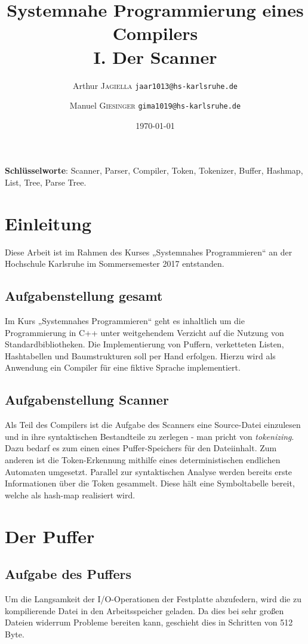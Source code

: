 \documentclass[
a4paper,   %
11pt,      %
oneside,   %
onecolumn, %
final      %
]{article}
\title{Systemnahe Programmierung eines Compilers\\I. Der Scanner}
\author{Arthur \textsc{Jagiella} \hspace{1cm} \texttt{jaar1013@hs-karlsruhe.de} \and Manuel \textsc{Giesinger} \hspace{1cm} \texttt{gima1019@hs-karlsruhe.de}}
\date{\today}
\begin{document}
\maketitle



\textbf{Schlüsselworte}: Scanner, Parser, Compiler, Token, Tokenizer, Buffer, Hashmap, List, Tree, Parse Tree.


\section{Einleitung} %
Diese Arbeit ist im Rahmen des Kurses „Systemnahes Programmieren“ an der Hochschule Karlsruhe im Sommersemester 2017 entstanden. 

\subsection{Aufgabenstellung gesamt}
Im Kurs „Systemnahes Programmieren“ geht es inhaltlich um die Programmierung in C++ unter weitgehendem Verzicht auf die Nutzung von Standardbibliotheken. Die Implementierung von Puffern, verketteten Listen, Hashtabellen und Baumstrukturen soll per Hand erfolgen. Hierzu wird als Anwendung ein Compiler für eine fiktive Sprache implementiert.

\subsection{Aufgabenstellung Scanner} 
Als Teil des Compilers ist die Aufgabe des Scanners eine Source-Datei einzulesen und in ihre syntaktischen Bestandteile zu zerlegen - man pricht von \emph{tokenizing}. Dazu bedarf es zum einen eines Puffer-Speichers für den Dateiinhalt. Zum anderen ist die Token-Erkennung mithilfe eines deterministischen endlichen Automaten umgesetzt.
Parallel zur syntaktischen Analyse werden bereits erste Informationen über die Token gesammelt. Diese hält eine Symboltabelle bereit, welche als hash-map realisiert wird.


\section{Der Puffer}

\subsection{Aufgabe des Puffers}
Um die Langsamkeit der I/O-Operationen der Festplatte abzufedern, wird die zu kompilierende Datei in den Arbeitsspeicher geladen.
Da dies bei sehr großen Dateien widerrum Probleme bereiten kann, geschieht dies in Schritten von 512 Byte.
\end{document}
